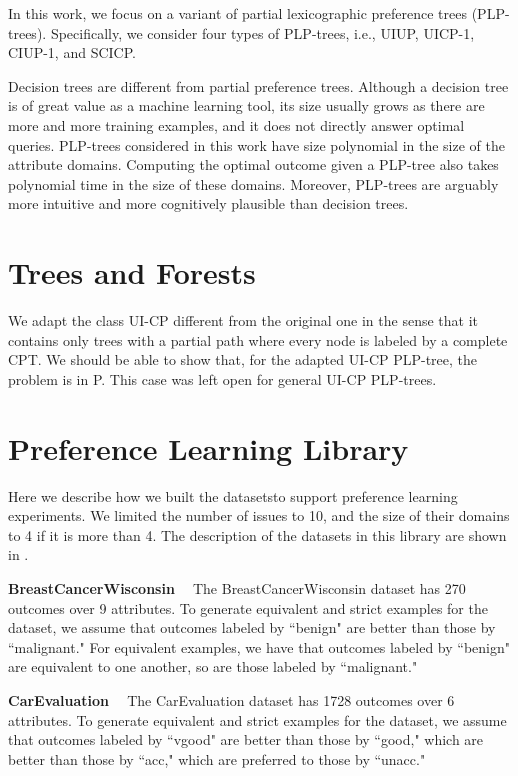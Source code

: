 In this work, we focus on a variant of
partial lexicographic preference trees (PLP-trees).
Specifically, we consider four types of PLP-trees,
i.e., UIUP, UICP-1, CIUP-1, and SCICP.

Decision trees are different from partial preference trees.
Although a decision tree is of great value as a machine
learning tool, its size usually grows as there are
more and more training examples, and it does not
directly answer optimal queries.
PLP-trees considered in this work have size polynomial
in the size of the attribute domains.
Computing the optimal outcome given a PLP-tree
also takes polynomial time in the size of these domains.
Moreover, PLP-trees are arguably more intuitive and 
more cognitively plausible than decision trees.


\section{Trees and Forests}
We adapt the class UI-CP different from the original one \cite{conf/aaai15/LiuT}
in the sense that it contains only trees with a partial path where
every node is labeled by a complete CPT.
We should be able to show that, for the adapted UI-CP PLP-tree, 
the  problem is in P.  
This case was left open for general UI-CP PLP-trees.


\section{Preference Learning Library}
Here we describe how we built the datasets\footnotemark to 
support preference learning experiments.
We limited the number of issues to 10, and the size of
their domains to 4 if it is more than 4.
The description of the datasets in this library are shown
in .


\smallskip \noindent \textbf{BreastCancerWisconsin \ }
The BreastCancerWisconsin dataset has 270 outcomes over 9 attributes.
To generate equivalent and strict examples for the dataset,
we assume that outcomes labeled by ``benign" are better than
those by ``malignant."
For equivalent examples, we have that outcomes labeled by ``benign" are equivalent
to one another, so are those labeled by ``malignant."

\smallskip \noindent \textbf{CarEvaluation \ }
The CarEvaluation dataset has 1728 outcomes over 6 attributes.
To generate equivalent and strict examples for the dataset,
we assume that outcomes labeled by ``vgood" are better than
those by ``good," which are better than those
by ``acc," which are preferred to those by ``unacc."

